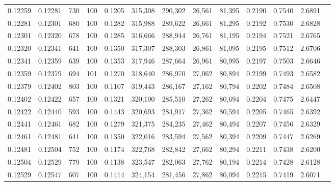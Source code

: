 \begin{tabular}{rrrrrrrrrrrrr}
0.12259 & 0.12281 &   730 & 100 &                                     0.1205 & 315,308 & 290,302 &  26,561 &  81,395 & 0.2190 & 0.7540 & 2.6891 \\
0.12281 & 0.12301 &   680 & 100 &                                     0.1282 & 315,988 & 289,622 &  26,661 &  81,295 & 0.2192 & 0.7530 & 2.6828 \\
0.12301 & 0.12320 &   678 & 100 &                                     0.1285 & 316,666 & 288,944 &  26,761 &  81,195 & 0.2194 & 0.7521 & 2.6765 \\
0.12320 & 0.12341 &   641 & 100 &                                     0.1350 & 317,307 & 288,303 &  26,861 &  81,095 & 0.2195 & 0.7512 & 2.6706 \\
0.12341 & 0.12359 &   639 & 100 &                                     0.1353 & 317,946 & 287,664 &  26,961 &  80,995 & 0.2197 & 0.7503 & 2.6646 \\
0.12359 & 0.12379 &   694 & 101 &                                     0.1270 & 318,640 & 286,970 &  27,062 &  80,894 & 0.2199 & 0.7493 & 2.6582 \\
0.12379 & 0.12402 &   803 & 100 &                                     0.1107 & 319,443 & 286,167 &  27,162 &  80,794 & 0.2202 & 0.7484 & 2.6508 \\
0.12402 & 0.12422 &   657 & 100 &                                     0.1321 & 320,100 & 285,510 &  27,262 &  80,694 & 0.2204 & 0.7475 & 2.6447 \\
0.12422 & 0.12440 &   593 & 100 &                                     0.1443 & 320,693 & 284,917 &  27,362 &  80,594 & 0.2205 & 0.7465 & 2.6392 \\
0.12441 & 0.12461 &   682 & 100 &                                     0.1279 & 321,375 & 284,235 &  27,462 &  80,494 & 0.2207 & 0.7456 & 2.6329 \\
0.12461 & 0.12481 &   641 & 100 &                                     0.1350 & 322,016 & 283,594 &  27,562 &  80,394 & 0.2209 & 0.7447 & 2.6269 \\
0.12481 & 0.12504 &   752 & 100 &                                     0.1174 & 322,768 & 282,842 &  27,662 &  80,294 & 0.2211 & 0.7438 & 2.6200 \\
0.12504 & 0.12529 &   779 & 100 &                                     0.1138 & 323,547 & 282,063 &  27,762 &  80,194 & 0.2214 & 0.7428 & 2.6128 \\
0.12529 & 0.12547 &   607 & 100 &                                     0.1414 & 324,154 & 281,456 &  27,862 &  80,094 & 0.2215 & 0.7419 & 2.6071 \\

\end{tabular}
